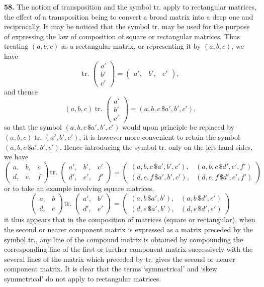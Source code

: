\documentclass[11pt,a4paper]{book}
\begin{document}
\begin{center}
\medskip
\noindent\textbf{58.} The notion of transposition and the symbol $\text{tr.}$ apply to rectangular matrices, the effect of a transposition being to convert a broad matrix into a deep one and reciprocally. It may be noticed that the symbol $\text{tr.}$ may be used for the purpose of expressing the law of composition of square or rectangular matrices. Thus treating $(a,b,c)$ as a rectangular matrix, or representing it by $(a,b,c)$, we have
\[\text{tr. }\begin{pmatrix} a' \\ b' \\ c' \end{pmatrix} = \begin{pmatrix} a', & b', & c' \end{pmatrix},\]
and thence
\[
(a,b,c)\;\text{tr. }\begin{pmatrix} a' \\ b' \\ c' \end{pmatrix}
= (a,b,c\,\$a',b',c'),
\]
so that the symbol $(a,b,c\,\$a',b',c')$ would upon principle be replaced by $(a,b,c)\;\text{tr. }(a',b',c')$; it is however more convenient to retain the symbol $(a,b,c\,\$a',b',c')$. Hence introducing the symbol $\text{tr.}$ only on the left-hand sides, we have
\[
\begin{pmatrix} a, & b, & c \\ d, & e, & f \end{pmatrix}
\text{tr. }\begin{pmatrix} a', & b', & c' \\ d', & e', & f' \end{pmatrix}
=
\begin{pmatrix}
(a,b,c\,\$a',b',c'), & (a,b,c\,\$d',e',f') \\
(d,e,f\,\$a',b',c'), & (d,e,f\,\$d',e',f')
\end{pmatrix}
\]
or to take an example involving square matrices,
\[
\begin{pmatrix} a, & b \\ d, & e \end{pmatrix}
\text{tr. }\begin{pmatrix} a', & b' \\ d', & e' \end{pmatrix}
=
\begin{pmatrix}
(a,b\,\$a',b'), & (a,b\,\$d',e') \\
(d,e\,\$a',b'), & (d,e\,\$d',e')
\end{pmatrix}
\]
it thus appears that in the composition of matrices (square or rectangular), when the second or nearer component matrix is expressed as a matrix preceded by the symbol $\text{tr.}$, any line of the compound matrix is obtained by compounding the corresponding line of the first or further component matrix successively with the several lines of the matrix which preceded by $\text{tr.}$ gives the second or nearer component matrix. It is clear that the terms `symmetrical' and `skew symmetrical' do not apply to rectangular matrices.


\end{center}
\end{document}
